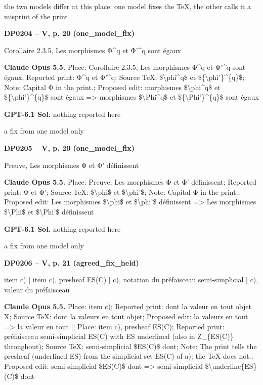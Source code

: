 the two models differ at this place: one model fixes the TeX, the other calls it a misprint of the print\par
\par\noindent\hypertarget{DP0204}{}\textbf{DP0204 -- V, p. 20 (one\_model\_fix)}\par
Corollaire 2.3.5, Les morphismes Φ\textasciicircum{}q et Φ'\textasciicircum{}q sont égaux\par
\textbf{Claude Opus 5.5.} Place: Corollaire 2.3.5, Les morphismes Φ\textasciicircum{}q et Φ'\textasciicircum{}q sont égaux; Reported print: Φ\textasciicircum{}q et Φ'\textasciicircum{}q; Source TeX: \$\textbackslash{}phi\textasciicircum{}q\$ et \$\{\textbackslash{}phi'\}\textasciicircum{}\{q\}\$; Note: Capital Φ in the print.; Proposed edit: morphismes \$\textbackslash{}phi\textasciicircum{}q\$ et \$\{\textbackslash{}phi'\}\textasciicircum{}\{q\}\$ sont égaux =\allowbreak > morphismes \$\textbackslash{}Phi\textasciicircum{}q\$ et \$\{\textbackslash{}Phi'\}\textasciicircum{}\{q\}\$ sont égaux\par
\textbf{GPT-6.1 Sol.} nothing reported here\par
a fix from one model only\par
\par\noindent\hypertarget{DP0205}{}\textbf{DP0205 -- V, p. 20 (one\_model\_fix)}\par
Preuve, Les morphismes Φ et Φ' définissent\par
\textbf{Claude Opus 5.5.} Place: Preuve, Les morphismes Φ et Φ' définissent; Reported print: Φ et Φ'; Source TeX: \$\textbackslash{}phi\$ et \$\textbackslash{}phi'\$; Note: Capital Φ in the print.; Proposed edit: Les morphismes \$\textbackslash{}phi\$ et \$\textbackslash{}phi'\$ définissent =\allowbreak > Les morphismes \$\textbackslash{}Phi\$ et \$\textbackslash{}Phi'\$ définissent\par
\textbf{GPT-6.1 Sol.} nothing reported here\par
a fix from one model only\par
\par\noindent\hypertarget{DP0206}{}\textbf{DP0206 -- V, p. 21 (agreed\_fix\_held)}\par
item c) | item c), presheaf ES(C) | c), notation du préfaisceau semi-simplicial | c), valeur du préfaisceau\par
\textbf{Claude Opus 5.5.} Place: item c); Reported print: dont la valeur en tout objet X; Source TeX: dont la valeurs en tout objet; Proposed edit: la valeurs en tout =\allowbreak > la valeur en tout || Place: item c), presheaf ES(C); Reported print: préfaisceau semi-simplicial ES(C) with ES underlined (also in Z\_\{ES(C)\} throughout); Source TeX: semi-simplicial \$ES(C)\$ dont; Note: The print tells the presheaf (underlined ES) from the simplicial set ES(C) of a); the TeX does not.; Proposed edit: semi-simplicial \$ES(C)\$ dont =\allowbreak > semi-simplicial \$\textbackslash{}underline\{ES\}(C)\$ dont\par
